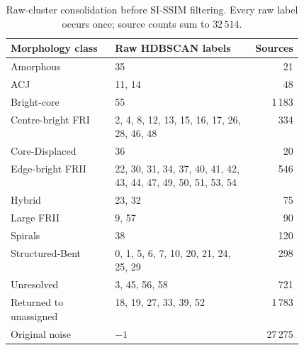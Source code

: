 \begin{table}[H]
\centering
\small
\setlength{\tabcolsep}{4pt}
\begin{tabular}{@{}lp{0.48\linewidth}r@{}}
\toprule
Morphology class & Raw HDBSCAN labels & Sources \\
\midrule
Amorphous & 35 & 21 \\
ACJ & 11, 14 & 48 \\
Bright-core & 55 & 1\,183 \\
Centre-bright FRI & 2, 4, 8, 12, 13, 15, 16, 17, 26, 28, 46, 48 & 334 \\
Core-Displaced & 36 & 20 \\
Edge-bright FRII & 22, 30, 31, 34, 37, 40, 41, 42, 43, 44, 47, 49, 50, 51, 53, 54 & 546 \\
Hybrid & 23, 32 & 75 \\
Large FRII & 9, 57 & 90 \\
Spirals & 38 & 120 \\
Structured-Bent & 0, 1, 5, 6, 7, 10, 20, 21, 24, 25, 29 & 298 \\
Unresolved & 3, 45, 56, 58 & 721 \\
\midrule
Returned to unassigned & 18, 19, 27, 33, 39, 52 & 1\,783 \\
Original noise & \(-1\) & 27\,275 \\
\bottomrule
\end{tabular}
\caption[Raw-cluster consolidation into morphology classes]{Raw-cluster consolidation before SI-SSIM filtering. Every raw label occurs once; source counts sum to \(32\,514\).}
\label{tab:cluster_class_mapping}
\end{table}
